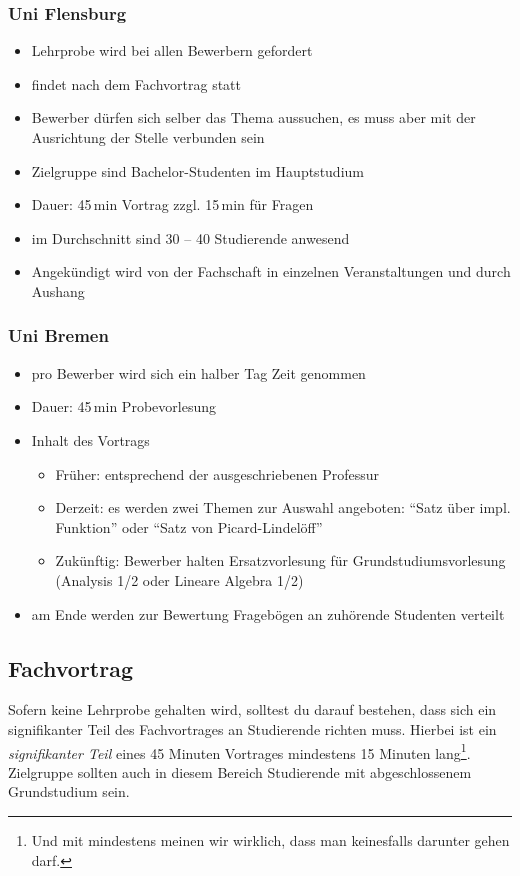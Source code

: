 \documentclass[10pt,twoside,a5paper,openright]{book}
\begin{document}
\subsubsection{Uni Flensburg}
\begin{itemize}
	\item Lehrprobe wird bei allen Bewerbern gefordert
	\item findet nach dem Fachvortrag statt
	\item Bewerber dürfen sich selber das Thema aussuchen, es muss aber mit der Ausrichtung der Stelle verbunden sein
	\item Zielgruppe sind Bachelor-Studenten im Hauptstudium
	\item Dauer: 45\,min Vortrag zzgl. 15\,min für Fragen
	\item im Durchschnitt sind 30 -- 40 Studierende anwesend
	\item Angekündigt wird von der Fachschaft in einzelnen Veranstaltungen und durch Aushang
\end{itemize}

\subsubsection{Uni Bremen}
\begin{itemize}
	\item pro Bewerber wird sich ein halber Tag Zeit genommen
	\item Dauer: 45\,min Probevorlesung 
	\item Inhalt des Vortrags
		\begin{itemize} 
			\item Früher: entsprechend der ausgeschriebenen Professur
			\item Derzeit: es werden zwei Themen zur Auswahl angeboten: "`Satz über impl. Funktion"' oder "`Satz von Picard-Lindelöff"'
			\item Zukünftig: Bewerber halten Ersatzvorlesung für Grundstudiumsvorlesung (Analysis 1/2 oder Lineare Algebra 1/2)
		\end{itemize}
	 \item am Ende werden zur Bewertung Fragebögen an zuhörende Studenten verteilt
\end{itemize} 


\subsection{Fachvortrag}
Sofern keine Lehrprobe gehalten wird, solltest du darauf bestehen, dass sich ein signifikanter Teil des Fachvortrages an Studierende richten muss. Hierbei ist ein \emph{signifikanter Teil} eines 45 Minuten Vortrages mindestens 15 Minuten lang\footnote{Und mit mindestens meinen wir wirklich, dass man keinesfalls darunter gehen darf.}. Zielgruppe sollten auch in diesem Bereich Studierende mit abgeschlossenem Grundstudium sein.
\end{document}
